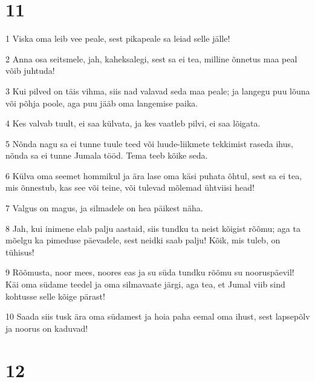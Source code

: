 \chapter{11}

\par 1 Viska oma leib vee peale, sest pikapeale sa leiad selle jälle!
\par 2 Anna osa seitsmele, jah, kaheksalegi, sest sa ei tea, milline õnnetus maa peal võib juhtuda!
\par 3 Kui pilved on täis vihma, siis nad valavad seda maa peale; ja langegu puu lõuna või põhja poole, aga puu jääb oma langemise paika.
\par 4 Kes valvab tuult, ei saa külvata, ja kes vaatleb pilvi, ei saa lõigata.
\par 5 Nõnda nagu sa ei tunne tuule teed või luude-liikmete tekkimist raseda ihus, nõnda sa ei tunne Jumala tööd. Tema teeb kõike seda.
\par 6 Külva oma seemet hommikul ja ära lase oma käsi puhata õhtul, sest sa ei tea, mis õnnestub, kas see või teine, või tulevad mõlemad ühtviisi head!
\par 7 Valgus on magus, ja silmadele on hea päikest näha.
\par 8 Jah, kui inimene elab palju aastaid, siis tundku ta neist kõigist rõõmu; aga ta mõelgu ka pimeduse päevadele, sest neidki saab palju! Kõik, mis tuleb, on tühisus!
\par 9 Rõõmusta, noor mees, noores eas ja su süda tundku rõõmu su nooruspäevil! Käi oma südame teedel ja oma silmavaate järgi, aga tea, et Jumal viib sind kohtusse selle kõige pärast!
\par 10 Saada siis tusk ära oma südamest ja hoia paha eemal oma ihust, sest lapsepõlv ja noorus on kaduvad!

\chapter{12}

